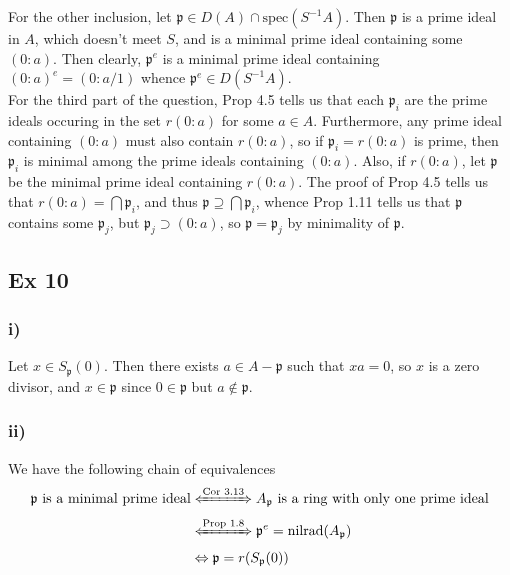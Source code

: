 \documentclass{article}
\theoremstyle{definition}
\newcommand{\nr}{\text{nilrad}}
\newcommand{\spec}{\text{spec}}
\begin{document}
For the other inclusion, let $\mathfrak{p} \in D(A) \cap \spec(S^{-1}A)$. Then
$\mathfrak{p}$ is a prime ideal in $A$, which doesn't meet $S$, and is a
minimal prime ideal containing some $(0:a)$. Then clearly, $\mathfrak{p}^{e}$
is a minimal prime ideal containing $(0:a)^{e} = (0:a/1)$ whence
$\mathfrak{p}^{e} \in D(S^{-1}A)$. \\

For the third part of the question, Prop 4.5 tells us that each
$\mathfrak{p}_i$ are the prime ideals occuring in the set $r(0:a)$ for some $a
\in A$. Furthermore, any prime ideal containing $(0:a)$ must also contain
$r(0:a)$, so if $\mathfrak{p}_i = r(0:a)$ is prime, then $\mathfrak{p}_i$ is
minimal among the prime ideals containing $(0:a)$. Also, if $r(0:a)$, let
$\mathfrak{p}$ be the minimal prime ideal containing $r(0:a)$. The proof of
Prop 4.5 tells us that $r(0:a) = \bigcap \mathfrak{p}_i$, and thus
$\mathfrak{p} \supseteq \bigcap \mathfrak{p}_i$, whence Prop 1.11 tells us that
$\mathfrak{p}$ contains some $\mathfrak{p}_j$, but $\mathfrak{p}_j \supset
(0:a)$, so $\mathfrak{p} = \mathfrak{p}_j$ by minimality of $\mathfrak{p}$.

\subsection*{Ex 10}
\subsubsection*{i)}

Let $x \in S_{\mathfrak{p}}(0)$. Then there exists $a \in A - \mathfrak{p}$
such that $xa = 0$, so $x$ is a zero divisor, and $x \in \mathfrak{p}$ since $0
\in \mathfrak{p}$ but $a \not \in \mathfrak{p}$.

\subsubsection*{ii)}

We have the following chain of equivalences
\begin{align*}
	\text{$\mathfrak{p}$ is a minimal prime ideal}
	&\xLeftrightarrow{\text{Cor 3.13}}
	\text{$A_{\mathfrak{p}}$ is a ring with only one prime ideal} \\
	&\xLeftrightarrow{\text{Prop 1.8}}
	\mathfrak{p}^{e} = \nr(A_{\mathfrak{p}}) \\
	&\Leftrightarrow
	\mathfrak{p} = r(S_{\mathfrak{p}}(0))
\end{align*}
\end{document}
